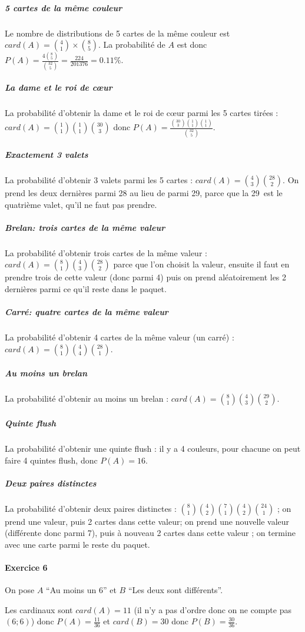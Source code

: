 \documentclass[10pt,a4paper,french]{article}
\begin{document}
\subparagraph{5 cartes de la même couleur}
Le nombre de distributions de 5 cartes de la même couleur est $card(A)={4 \choose 1}\times{8 \choose 5}$. La probabilité de $A$ est donc $P(A)=\frac{4 {8 \choose 5}}{{32 \choose 5}} = \frac{224}{201376}=0.11\%$.

\subparagraph{La dame et le roi de cœur}
La probabilité d'obtenir la dame et le roi de cœur parmi les 5 cartes tirées : $card(A)={1\choose 1}{1\choose 1}{30 \choose 3}$ donc $P(A)=\frac{{30 \choose 3}{1\choose 1}{1\choose 1}}{{32 \choose 5}}$.

\subparagraph{Exactement 3 valets}
La probabilité d'obtenir 3 valets parmi les 5 cartes : $card(A)={4 \choose 3}{28 \choose 2}$. On prend les deux dernières parmi 28 au lieu de parmi 29, parce que la 29\ieme~est le quatrième valet, qu'il ne faut pas prendre.

\subparagraph{Brelan: trois cartes de la même valeur}
La probabilité d'obtenir trois cartes de la même valeur : $card(A)={8 \choose 1} {4 \choose 3} {28 \choose 2}$ parce que l'on choisit la valeur, ensuite il faut en prendre trois de cette valeur (donc parmi 4) puis on prend aléatoirement les 2 dernières parmi ce qu'il reste dans le paquet.

\subparagraph{Carré: quatre cartes de la même valeur}
La probabilité d'obtenir 4 cartes de la même valeur (un carré) : $card(A)={8 \choose 1}{4 \choose 4}{28 \choose 1}$.

\subparagraph{Au moins un brelan}
La probabilité d'obtenir au moins un brelan : $card(A)={8 \choose 1}{4 \choose 3}{29 \choose 2}$.

\subparagraph{Quinte flush}
La probabilité d'obtenir une quinte flush : il y a 4 couleurs, pour chacune on peut faire 4 quintes flush, donc $P(A)=16$.

\subparagraph{Deux paires distinctes}
La probabilité d'obtenir deux paires distinctes : ${8 \choose 1}{4 \choose 2}{7 \choose 1}{4 \choose 2}{24 \choose 1}$ ; on prend une valeur, puis 2 cartes dans cette valeur; on prend une nouvelle valeur (différente donc parmi 7), puis à nouveau 2 cartes dans cette valeur ; on termine avec une carte parmi le reste du paquet.

\paragraph{Exercice 6}
On pose $A$ ``Au moins un 6'' et $B$ ``Les deux sont différents''.

Les cardinaux sont $card(A)=11$ (il n'y a pas d'ordre donc on ne compte pas $(6; 6)$) donc $P(A)=\frac{11}{36}$ et $card(B)=30$ donc $P(B)=\frac{30}{36}$.
\end{document}
